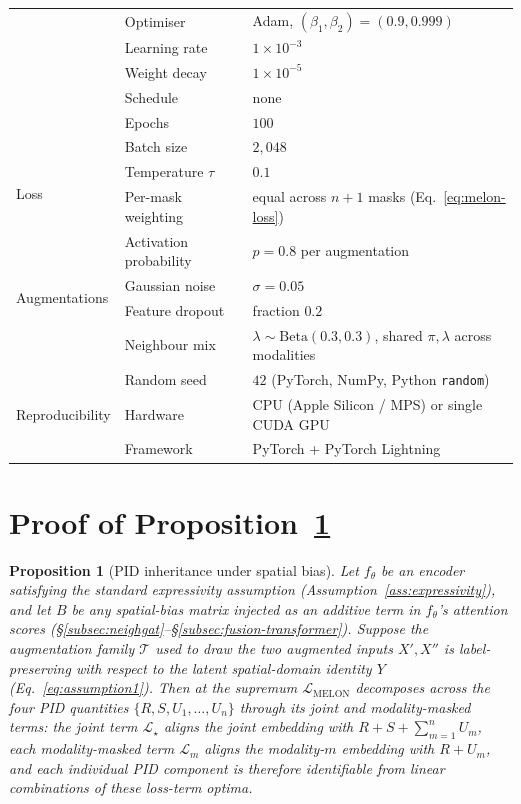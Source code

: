 \documentclass{article}
\theoremstyle{plain}
\newtheorem{proposition}{Proposition}
\theoremstyle{definition}
\begin{document}
\begin{table}[!htbp]
\begin{tabular}{lll}
  & Optimiser                 & Adam, $(\beta_1,\beta_2)=(0.9,0.999)$ \\
  & Learning rate             & $1\!\times\!10^{-3}$ \\
  & Weight decay              & $1\!\times\!10^{-5}$ \\
  & Schedule                  & none \\
  & Epochs                    & $100$ \\
  & Batch size                & $2{,}048$ \\
\midrule
\multirow{2}{*}{Loss}
  & Temperature $\tau$        & $0.1$ \\
  & Per-mask weighting        & equal across $n{+}1$ masks (Eq.~\ref{eq:melon-loss}) \\
\midrule
\multirow{4}{*}{Augmentations}
  & Activation probability    & $p=0.8$ per augmentation \\
  & Gaussian noise            & $\sigma=0.05$ \\
  & Feature dropout           & fraction $0.2$ \\
  & Neighbour mix             & $\lambda\sim\mathrm{Beta}(0.3,0.3)$, shared $\pi,\lambda$ across modalities \\
\midrule
\multirow{3}{*}{Reproducibility}
  & Random seed               & $42$ (PyTorch, NumPy, Python \texttt{random}) \\
  & Hardware                  & CPU (Apple Silicon / MPS) or single CUDA GPU \\
  & Framework                 & PyTorch + PyTorch Lightning \\
\bottomrule
\end{tabular}
\end{table}

\FloatBarrier
\section{Proof of Proposition~\ref{prop:pid-inheritance}}\label{app:proof}

\begin{proposition}[PID inheritance under spatial bias]\label{prop:pid-inheritance}
Let $f_\theta$ be an encoder satisfying the standard expressivity assumption (Assumption~\ref{ass:expressivity}), and let $B$ be any spatial-bias matrix injected as an additive term in $f_\theta$'s attention scores (\S\ref{subsec:neighgat}--\S\ref{subsec:fusion-transformer}). Suppose the augmentation family $\mathcal{T}$ used to draw the two augmented inputs $X', X''$ is label-preserving with respect to the latent spatial-domain identity $Y$ (Eq.~\ref{eq:assumption1}). Then at the supremum $\mathcal{L}_{\mathrm{MELON}}$ decomposes across the four PID quantities $\{R, S, U_1, \ldots, U_n\}$ through its joint and modality-masked terms: the joint term $\mathcal{L}_{\star}$ aligns the joint embedding with $R + S + \sum_{m=1}^{n} U_m$, each modality-masked term $\mathcal{L}_{m}$ aligns the modality-$m$ embedding with $R + U_m$, and each individual PID component is therefore identifiable from linear combinations of these loss-term optima.
\end{proposition}
\end{document}
